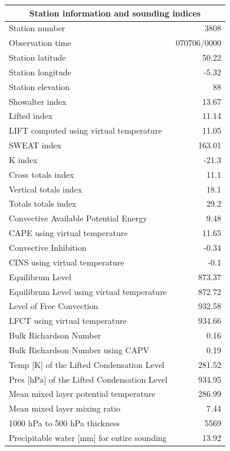 \documentclass{article}
\begin{document}
\newpage
\begin{longtable}{l|r}
\multicolumn{2}{c}{\textbf{Station information and sounding indices}} \\ \hline
Station number & 3808 \\
Observation time & \multicolumn{1}{l}{ 070706/0000} \\
Station latitude & 50.22 \\
Station longitude & -5.32 \\
Station elevation & 88 \\
Showalter index & 13.67 \\
Lifted index & 11.14 \\
LIFT computed using virtual temperature & 11.05 \\
SWEAT index & 163.01 \\
K index & -21.3 \\
Cross totals index & 11.1 \\
Vertical totals index & 18.1 \\
Totals totals index & 29.2 \\
Convective Available Potential Energy & 9.48 \\
CAPE using virtual temperature & 11.65 \\
Convective Inhibition & -0.34 \\
CINS using virtual temperature & -0.1 \\
Equilibrum Level & 873.37 \\
Equilibrum Level using virtual temperature & 872.72 \\
Level of Free Convection & 932.58 \\
LFCT using virtual temperature & 934.66 \\
Bulk Richardson Number & 0.16 \\
Bulk Richardson Number using CAPV & 0.19 \\
Temp [K] of the Lifted Condensation Level & 281.52 \\
Pres [hPa] of the Lifted Condensation Level & 934.95 \\
Mean mixed layer potential temperature & 286.99 \\
Mean mixed layer mixing ratio & 7.44 \\
1000 hPa to 500 hPa thickness & 5569 \\
Precipitable water [mm] for entire sounding & 13.92 \\
\end{longtable}%
\end{document}
